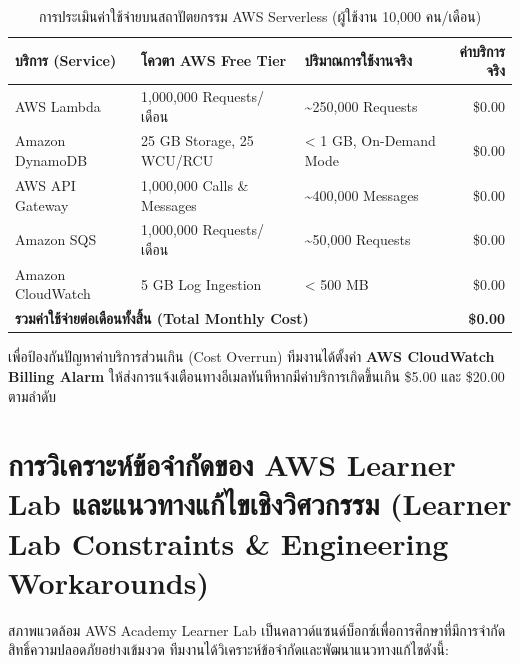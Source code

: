 \documentclass[12pt,a4paper]{report}
\begin{document}
\begin{table}[H]
\centering
\caption{การประเมินค่าใช้จ่ายบนสถาปัตยกรรม AWS Serverless (ผู้ใช้งาน 10,000 คน/เดือน)}
\label{tab:cost_breakdown}
\begin{tabularx}{\textwidth}{lXXr}
\toprule
\textbf{บริการ (Service)} & \textbf{โควตา AWS Free Tier} & \textbf{ปริมาณการใช้งานจริง} & \textbf{ค่าบริการจริง} \\
\midrule
AWS Lambda & 1,000,000 Requests/เดือน & \textasciitilde250,000 Requests & \$0.00 \\
Amazon DynamoDB & 25 GB Storage, 25 WCU/RCU & < 1 GB, On-Demand Mode & \$0.00 \\
AWS API Gateway & 1,000,000 Calls \& Messages & \textasciitilde400,000 Messages & \$0.00 \\
Amazon SQS & 1,000,000 Requests/เดือน & \textasciitilde50,000 Requests & \$0.00 \\
Amazon CloudWatch & 5 GB Log Ingestion & < 500 MB & \$0.00 \\
\midrule
\multicolumn{3}{l}{\textbf{รวมค่าใช้จ่ายต่อเดือนทั้งสิ้น (Total Monthly Cost)}} & \textbf{\$0.00} \\
\bottomrule
\end{tabularx}
\end{table}

เพื่อป้องกันปัญหาค่าบริการส่วนเกิน (Cost Overrun) ทีมงานได้ตั้งค่า \textbf{AWS CloudWatch Billing Alarm} ให้ส่งการแจ้งเตือนทางอีเมลทันทีหากมีค่าบริการเกิดขึ้นเกิน \$5.00 และ \$20.00 ตามลำดับ

\section{การวิเคราะห์ข้อจำกัดของ AWS Learner Lab และแนวทางแก้ไขเชิงวิศวกรรม (Learner Lab Constraints \& Engineering Workarounds)}
สภาพแวดล้อม AWS Academy Learner Lab เป็นคลาวด์แซนด์บ็อกซ์เพื่อการศึกษาที่มีการจำกัดสิทธิ์ความปลอดภัยอย่างเข้มงวด ทีมงานได้วิเคราะห์ข้อจำกัดและพัฒนาแนวทางแก้ไขดังนี้:
\end{document}
